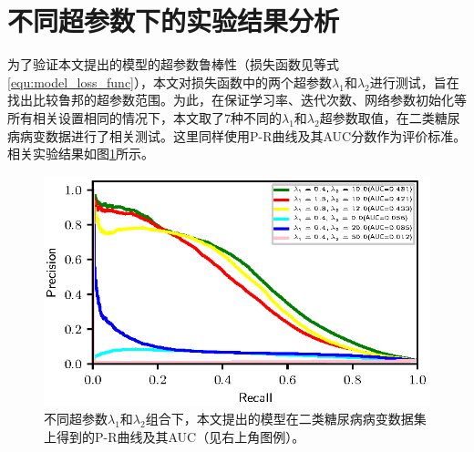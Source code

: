 \begin{table}[h]
	\centering
	\caption{不同超参数组合下，本文提出的模型在二类视网膜糖尿病病变数据集上计算得到的AUC分数列表。}		
	\label{tab:dis_arch}
\end{table}

\section{不同超参数下的实验结果分析}\label{sec:hyper_paras}
为了验证本文提出的模型的超参数鲁棒性（损失函数见等式\ref{equ:model_loss_func}），本文对损失函数中的两个超参数$\lambda_{1}$和$\lambda_{2}$进行测试，旨在找出比较鲁邦的超参数范围。为此，在保证学习率、迭代次数、网络参数初始化等所有相关设置相同的情况下，本文取了$7$种不同的$\lambda_{1}$和$\lambda_{2}$超参数取值，在二类糖尿病病变数据进行了相关测试。这里同样使用P-R曲线及其AUC分数作为评价标准。相关实验结果如图\ref{fig:pr_curve_retinal_hyper_paras}所示。

\begin{figure}[h]
	\centering
	\includegraphics[width=1.0\textwidth]{figure/pr_curve_retinal_hyper_paras/pr_curve.eps}
	\caption{不同超参数$\lambda_{1}$和$\lambda_{2}$组合下，本文提出的模型在二类糖尿病病变数据集上得到的P-R曲线及其AUC（见右上角图例）。} 
	\label{fig:pr_curve_retinal_hyper_paras}
\end{figure}

